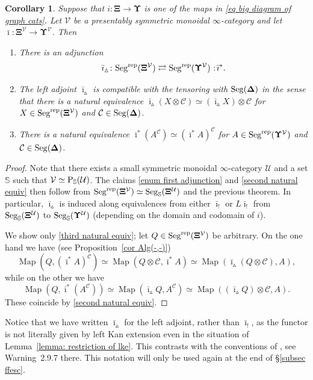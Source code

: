 \documentclass{amsart}
\numberwithin{theorem}{subsection}
\newtheorem{corollary}[theorem]{Corollary}
\theoremstyle{definition}
\newcommand{\Map}{\operatorname{Map}}
\newcommand{\xcc}{\mathcal{C}}
\newcommand{\xU}{\mathcal{U}}
\newcommand{\xV}{\mathcal{V}}
\newcommand{\Pre}{\name{P}}
\newcommand{\PSU}{\Pre_{\mathbb{S}}(\xU)}
\newcommand*\cocolon{%
	\nobreak
	\mskip6mu plus1mu
	\mathpunct{}%
	\nonscript
	\mkern-\thinmuskip
	{:}%
	\mskip2mu
	\relax
}
\newcommand{\icat}{$\infty$-category}
\newcommand{\name}[1]{\ensuremath{\text{\textup{#1}}}}
\newcommand{\simp}{\mathbf{\Delta}}
\newcommand{\gc}{\mathbf{\Xi}}
\newcommand{\gcone}{\gc}
\newcommand{\gctwo}{\mathbf{\Upsilon}}
\newcommand{\gcVone}{\gcone^\xV}
\newcommand{\gcVtwo}{\gctwo^\xV}
\newcommand{\barishriek}{\bar \imath_!}
\newcommand{\barinotshriek}{\bar \imath_\vartriangle}
\newcommand{\bariustar}{\bar \imath^*}
\newcommand{\Seg}{\name{Seg}}
\newcommand{\Segrep}{\Seg^{\name{rep}}}
\newcommand{\SegS}{\Seg_{\mathbb{S}}}
\begin{document}
\begin{corollary}
\label{cor adjoint rep}
Suppose that $i \colon  \gcone\to\gctwo$ is one of the maps in \eqref{eq big diagram of graph cats}.
Let $\xV$ be a presentably symmetric monoidal \icat{} and let $\bar\imath \colon \gcVone \to \gcVtwo$.
Then
	\begin{enumerate}[label=(\roman*), ref={\roman*}]
		\item There is an adjunction \label{enum first adjunction}
		\[ \barinotshriek\colon\Segrep(\gcVone) \rightleftarrows
		\Segrep(\gcVtwo)\cocolon\bariustar.\]
		\item The left adjoint $\barinotshriek$ is compatible with the tensoring with $\Seg(\simp)$ in the sense that there is a natural equivalence $\barinotshriek(X \otimes \xcc) \simeq (\barinotshriek X) \otimes \xcc$ for $X \in \Segrep(\gcVone)$ and $\xcc \in \Seg(\simp)$.\label{second natural equiv}
		\item There is a natural equivalence
		$\bariustar (A^{\xcc}) \simeq
		(\bariustar A)^{\xcc}$ for $A \in
		\Segrep(\gcVtwo)$ and $\xcc \in \Seg(\simp)$.
		\label{third natural equiv}
	\end{enumerate}
\end{corollary}
\begin{proof}
	Note that there exists a small symmetric monoidal $\infty$-category $\xU$ and a set $\mathbb{S}$ such that $\xV\simeq \PSU$.
The claims \eqref{enum first adjunction} and \eqref{second natural equiv} then follow from $\Segrep(\gc^\xV)\simeq \SegS(\gc^\xU)$ and the previous theorem.
In particular, $\barinotshriek$ is induced along equivalences from either $\barishriek$ or $L\barishriek$ from $\SegS(\gcone^\xU)$ to $\SegS(\gctwo^\xU)$ (depending on the domain and codomain of $i$).

We show only \eqref{third natural equiv}; let $Q \in \Segrep(\gcVone)$ be arbitrary.
On the one hand we have (see Proposition~\ref{cor Alg(-,-)}) 
\[
	\Map(Q, (\bariustar A)^{\xcc}) \simeq \Map(Q \otimes \xcc, \bariustar A) \simeq \Map(\barinotshriek (Q \otimes \xcc), A), 
\]
while on the other we have 
\[
	\Map(Q, \bariustar(A^\xcc)) \simeq \Map(\barinotshriek Q , A^\xcc) 
	\simeq \Map((\barinotshriek Q) \otimes \xcc, A).
\]
These coincide by \eqref{second natural equiv}.
\end{proof}

Notice that we have written $\barinotshriek$ for the left adjoint, rather than $\barishriek$, as the functor is not literally given by left Kan extension even in the situation of Lemma~\ref{lemma: restriction of lke}.
This contrasts with the conventions of \cite{ChuHaugseng}, see Warning~2.9.7 there.
This notation will only be used again at the end of \S\ref{subsec ffesc}.
 
\end{document}
